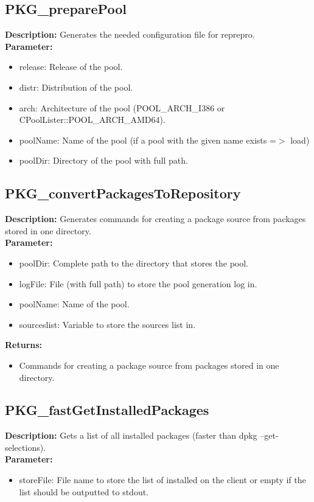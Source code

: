 \subsection{PKG\_preparePool}
\textbf{Description:} Generates the needed configuration file for reprepro.\\
\textbf{Parameter:}
\begin{itemize}
\item release: Release of the pool.
\item distr: Distribution of the pool.
\item arch: Architecture of the pool (POOL\_ARCH\_I386 or CPoolLister::POOL\_ARCH\_AMD64).
\item poolName: Name of the pool (if a pool with the given name exists =$>$ load)
\item poolDir: Directory of the pool with full path.
\end{itemize}

\subsection{PKG\_convertPackagesToRepository}
\textbf{Description:} Generates commands for creating a package source from packages stored in one directory.\\
\textbf{Parameter:}
\begin{itemize}
\item poolDir: Complete path to the directory that stores the pool.
\item logFile: File (with full path) to store the pool generation log in.
\item poolName: Name of the pool.
\item sourceslist: Variable to store the sources list in.
\end{itemize}
\textbf{Returns:}
\begin{itemize}
\item Commands for creating a package source from packages stored in one directory.
\end{itemize}

\subsection{PKG\_fastGetInstalledPackages}
\textbf{Description:} Gets a list of all installed packages (faster than dpkg --get-selections).\\
\textbf{Parameter:}
\begin{itemize}
\item storeFile: File name to store the list of installed on the client or empty if the list should be outputted to stdout.
\end{itemize}

